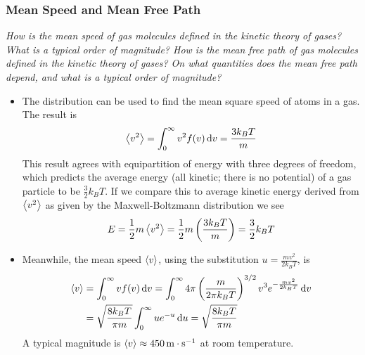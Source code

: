 \documentclass[11pt, a4paper]{article}
\newcommand{\diff}{\mathop{}\!\mathrm{d}} %
\begin{document}
\subsubsection{Mean Speed and Mean Free Path}
\textit{How is the mean speed of gas molecules defined in the kinetic theory of gases? What is a typical order of magnitude? How is the mean free path of gas molecules defined in the kinetic theory of gases? On what quantities does the mean free path depend, and what is a typical order of magnitude?} 
\begin{itemize}

	\item The distribution can be used to find the mean square speed of atoms in a gas. The result is
	\begin{equation*}
		\expval{v^{2}} = \int_{0}^{\infty}v^{2} f(v) \diff v = \frac{3k_{B}T}{m}
	\end{equation*}
	This result agrees with equipartition of energy with three degrees of freedom, which predicts the average energy (all kinetic; there is no potential) of a gas particle to be $ \frac{3}{2}k_{B}T $. If we compare this to average kinetic energy derived from $ \expval{v^{2}} $ as given by the Maxwell-Boltzmann distribution we see
	\begin{equation*}
		E = \frac{1}{2}m \expval{v^{2}} = \frac{1}{2}m \left(\frac{3k_{B}T}{m}\right) = \frac{3}{2}k_{B}T
	\end{equation*}
	
	\item Meanwhile, the mean speed $ \expval{v} $, using the substitution $ u = \frac{mv^{2}}{2k_{B}T}$, is
	\begin{align*}
		\expval{v} &= \int_{0}^{\infty}v f(v) \diff v = \int_{0}^{\infty}4\pi \left(\frac{m}{2\pi k_{B}T}\right)^{3/2}v^{3}e^{-\frac{mv^{2}}{2k_{B}T}}\diff v \\
		&=\sqrt{\frac{8k_{B}T}{\pi m}} \int_{0}^{\infty}ue^{-u}\diff u =\sqrt{\frac{8k_{B}T}{\pi m}}
	\end{align*}
	A typical magnitude is $ \expval{v} \approx \SI{450}{\meter \cdot \second^{-1}} $ at room temperature.


\end{itemize}
\end{document}
